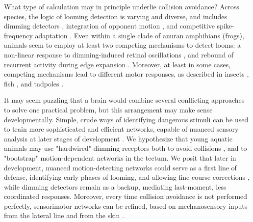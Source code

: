 \documentclass{article}
\begin{document}
What type of calculation may in principle underlie collision avoidance? Across species, the logic of looming detection is varying and diverse, and includes dimming detectors \citep{ishikane2005, munch2009}, integration of opponent motion \citep{klapoetke2017looming}, and competitive spike-frequency adaptation \citep{peron2009adaptation, fotowat2011multiplexing}. Even within a single clade of anuran amphibians (frogs), animals seem to employ at least two competing mechanisms to detect looms: a non-linear response to dimming-induced retinal oscillations \citep{baranauskas2012}, and rebound of recurrent activity during edge expansion \citep{khakhalin2014, jang2016}. Moreover, at least in some cases, competing mechanisms lead to different motor responses, as described in insects \citep{card2008tradeoffs, chan2013avoidance}, fish \citep{budick2000repertoire, burgess2007twoescapes, portugues2009behaviors, temizer2015pathway, bhattacharyya2017assessment}, and tadpoles \citep{khakhalin2014}.

It may seem puzzling that a brain would combine several conflicting approaches to solve one practical problem, but this arrangement may make sense developmentally. Simple, crude ways of identifying dangerous stimuli can be used to train more sophisticated and efficient networks, capable of nuanced sensory analysis at later stages of development \citep{marblestone2016deeplearning}. We hypothesize that young aquatic animals may use "hardwired" dimming receptors \citep{baranauskas2012} both to avoid collisions \citep{dong2009}, and to "bootstrap" motion-dependent networks in the tectum. We posit that later in development, nuanced motion-detecting networks could serve as a first line of defense, identifying early phases of looming, and allowing fine course corrections \citep{khakhalin2014, bhattacharyya2017assessment}, while dimming detectors remain as a backup, mediating last-moment, less coordinated responses. Moreover, every time collision avoidance is not performed perfectly, sensorimotor networks can be refined, based on mechanosensory inputs from the lateral line and from the skin \citep{felch2016, helmbrecht2018topography}.
\end{document}
